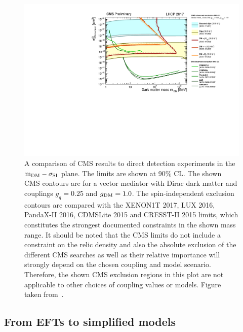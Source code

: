 \begin{figure}[ht]
  \centering
  \includegraphics[width=\textwidth]{SI_CMSDD_Summary.pdf}
  \caption{A comparison of \acs{CMS} results to direct detection experiments in the $\protect\mathrm{m_{DM}}-\sigma_{\mathrm{SI}}$ plane. The limits are shown at 90\% CL. The shown \acs{CMS} contours are for a vector mediator with Dirac dark matter and  couplings $g_q=0.25$ and $\protect g_{\mathrm{DM}} = 1.0$. The spin-independent exclusion contours are compared with the XENON1T 2017, LUX 2016, PandaX-II 2016, CDMSLite 2015 and CRESST-II 2015 limits, which constitutes the strongest documented constraints in the shown mass range. It should be noted that the \acs{CMS} limits do not include a constraint on the relic density and also the absolute exclusion of the different \acs{CMS} searches as well as their relative importance will strongly depend on the chosen coupling and model scenario.  Therefore, the shown \acs{CMS} exclusion regions in this plot are not applicable to other choices of coupling values or models. Figure taken from~\cite{DMsummary}.}
  \label{fig:summary_SI}
\end{figure}

\subsection{From EFTs to simplified models}
\label{sec:monojet_models}

